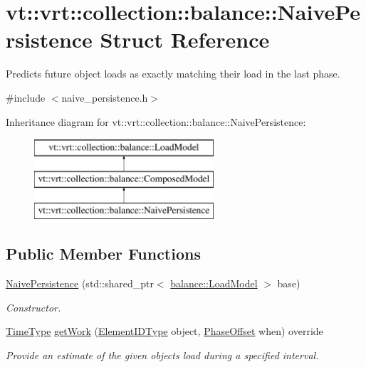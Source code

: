 \hypertarget{structvt_1_1vrt_1_1collection_1_1balance_1_1_naive_persistence}{}\section{vt\+:\+:vrt\+:\+:collection\+:\+:balance\+:\+:Naive\+Persistence Struct Reference}
\label{structvt_1_1vrt_1_1collection_1_1balance_1_1_naive_persistence}


Predicts future object loads as exactly matching their load in the last phase.  




{\ttfamily \#include $<$naive\+\_\+persistence.\+h$>$}

Inheritance diagram for vt\+:\+:vrt\+:\+:collection\+:\+:balance\+:\+:Naive\+Persistence\+:\begin{figure}[H]
\begin{center}
\leavevmode
\includegraphics[height=3.000000cm]{structvt_1_1vrt_1_1collection_1_1balance_1_1_naive_persistence}
\end{center}
\end{figure}
\subsection*{Public Member Functions}
\begin{DoxyCompactItemize}
\item 
\hyperlink{structvt_1_1vrt_1_1collection_1_1balance_1_1_naive_persistence_a7eb9921b30fbf64f3c2dbbe5a8cce396}{Naive\+Persistence} (std\+::shared\+\_\+ptr$<$ \hyperlink{classvt_1_1vrt_1_1collection_1_1balance_1_1_load_model}{balance\+::\+Load\+Model} $>$ base)
\begin{DoxyCompactList}\small\item\em Constructor. \end{DoxyCompactList}\item 
\hyperlink{namespacevt_a876a9d0cd5a952859c72de8a46881442}{Time\+Type} \hyperlink{structvt_1_1vrt_1_1collection_1_1balance_1_1_naive_persistence_a1cea196b4ca24d5bad5f350f0adcd721}{get\+Work} (\hyperlink{namespacevt_1_1vrt_1_1collection_1_1balance_a14c8d2c972f2913aa3f1636e5be0a120}{Element\+I\+D\+Type} object, \hyperlink{structvt_1_1vrt_1_1collection_1_1balance_1_1_phase_offset}{Phase\+Offset} when) override
\begin{DoxyCompactList}\small\item\em Provide an estimate of the given object\textquotesingle{}s load during a specified interval. \end{DoxyCompactList}\end{DoxyCompactItemize}


